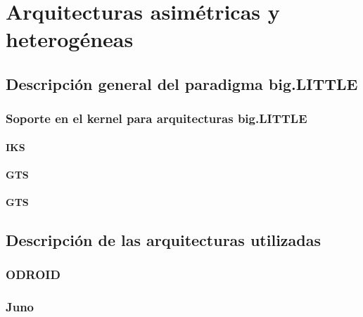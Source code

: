 \cleardoublepage

\chapter{Arquitecturas asimétricas y heterogéneas}
\label{ch:chapter2}

\section{Descripción general del paradigma big.LITTLE}

\subsection{Soporte en el kernel para arquitecturas big.LITTLE}

\subsubsection{IKS}

\subsubsection{GTS}

\subsubsection{GTS}

\section{Descripción de las arquitecturas utilizadas}

\subsection{ODROID}

\subsection{Juno}




